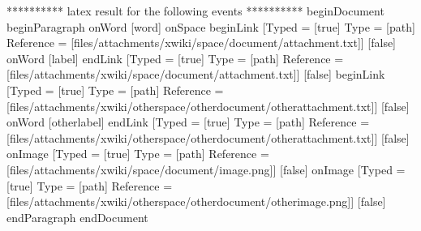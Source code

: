 ********** latex result for the following events **********
beginDocument
beginParagraph
onWord [word]
onSpace
beginLink [Typed = [true] Type = [path] Reference = [files/attachments/xwiki/space/document/attachment.txt]] [false]
onWord [label]
endLink [Typed = [true] Type = [path] Reference = [files/attachments/xwiki/space/document/attachment.txt]] [false]
beginLink [Typed = [true] Type = [path] Reference = [files/attachments/xwiki/otherspace/otherdocument/otherattachment.txt]] [false]
onWord [otherlabel]
endLink [Typed = [true] Type = [path] Reference = [files/attachments/xwiki/otherspace/otherdocument/otherattachment.txt]] [false]
onImage [Typed = [true] Type = [path] Reference = [files/attachments/xwiki/space/document/image.png]] [false]
onImage [Typed = [true] Type = [path] Reference = [files/attachments/xwiki/otherspace/otherdocument/otherimage.png]] [false]
endParagraph
endDocument